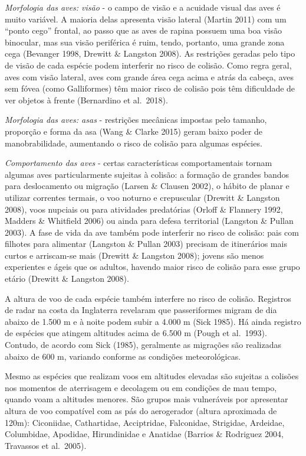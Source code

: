 \documentclass[
]{scrbook}
\begin{document}
\emph{Morfologia das aves: visão} - o campo de visão e a acuidade visual das aves é muito variável. A maioria delas apresenta visão lateral (Martin 2011) com um ``ponto cego'' frontal, ao passo que as aves de rapina possuem uma boa visão binocular, mas sua visão periférica é ruim, tendo, portanto, uma grande zona cega (Bevanger 1998, Drewitt \& Langston 2008). As restrições geradas pelo tipo de visão de cada espécie podem interferir no risco de colisão. Como regra geral, aves com visão lateral, aves com grande área cega acima e atrás da cabeça, aves sem fóvea (como Galliformes) têm maior risco de colisão pois têm dificuldade de ver objetos à frente (Bernardino et al.~2018).

\emph{Morfologia das aves: asas} - restrições mecânicas impostas pelo tamanho, proporção e forma da asa (Wang \& Clarke 2015) geram baixo poder de manobrabilidade, aumentando o risco de colisão para algumas espécies.

\emph{Comportamento das aves} - certas características comportamentais tornam algumas aves particularmente sujeitas à colisão: a formação de grandes bandos para deslocamento ou migração (Larsen \& Clausen 2002), o hábito de planar e utilizar correntes termais, o voo noturno e crepuscular (Drewitt \& Langston 2008), voos nupciais ou para atividades predatórias (Orloff \& Flannery 1992, Madders \& Whitfield 2006) ou ainda para defesa territorial (Langston \& Pullan 2003). A fase de vida da ave também pode interferir no risco de colisão: pais com filhotes para alimentar (Langston \& Pullan 2003) precisam de itinerários mais curtos e arriscam-se mais (Drewitt \& Langston 2008); jovens são menos experientes e ágeis que os adultos, havendo maior risco de colisão para esse grupo etário (Drewitt \& Langston 2008).

A altura de voo de cada espécie também interfere no risco de colisão. Registros de radar na costa da Inglaterra revelaram que passeriformes migram de dia abaixo de 1.500 m e à noite podem subir a 4.000 m (Sick 1985). Há ainda registro de espécies que atingem altitudes acima de 6.500 m (Pough et al.~1993). Contudo, de acordo com Sick (1985), geralmente as migrações são realizadas abaixo de 600 m, variando conforme as condições meteorológicas.

Mesmo as espécies que realizam voos em altitudes elevadas são sujeitas a colisões nos momentos de aterrisagem e decolagem ou em condições de mau tempo, quando voam a altitudes menores. São grupos mais vulneráveis por apresentar altura de voo compatível com as pás do aerogerador (altura aproximada de 120m): Ciconiidae, Cathartidae, Acciptridae, Falconidae, Strigidae, Ardeidae, Columbidae, Apodidae, Hirundinidae e Anatidae (Barrios \& Rodriguez 2004, Travassos et al.~2005).
\end{document}
